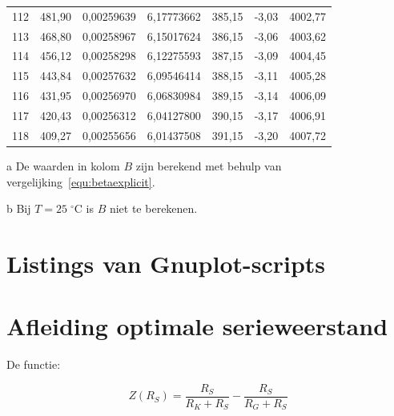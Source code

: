 \documentclass[12pt,a4paper,final,twoside,fleqn]{article}
\newcommand{\mathcelc}[1]{\mbox{$#1\;^\circ\text{C}$}}
\begin{document}
\begin{ThreePartTable}
\begin{longtable}{rrrrrrr}
112          & 481,90    & 0,00259639    & 6,17773662  & 385,15     & -3,03      & 4002,77 \\
113          & 468,80    & 0,00258967    & 6,15017624  & 386,15     & -3,06      & 4003,62 \\
114          & 456,12    & 0,00258298    & 6,12275593  & 387,15     & -3,09      & 4004,45 \\
115          & 443,84    & 0,00257632    & 6,09546414  & 388,15     & -3,11      & 4005,28 \\
116          & 431,95    & 0,00256970    & 6,06830984  & 389,15     & -3,14      & 4006,09 \\
117          & 420,43    & 0,00256312    & 6,04127800  & 390,15     & -3,17      & 4006,91 \\
118          & 409,27    & 0,00255656    & 6,01437508  & 391,15     & -3,20      & 4007,72 \\
\end{longtable}
\begin{tablenotes}
\footnotesize
\item [a] De waarden in kolom $B$ zijn berekend met behulp van vergelijking~\eqref{equ:betaexplicit}.
\item [b] Bij $T=\mathcelc{25}$ is $B$ niet te berekenen.
\end{tablenotes}
\end{ThreePartTable}

\clearpage
\section{Listings van Gnuplot-scripts}
\label{app:ntc_shh_kelvin}

\newpage
\label{app:ntc_shh_straightline_beta}

\newpage
\label{app:ntc_shh_straightline_adapt}



\clearpage
\section{Afleiding optimale serieweerstand}
\label{app:afleiding}
De functie:

\begin{equation}
Z(R_S) = \dfrac{R_S}{R_K+R_S}-\dfrac{R_S}{R_G+R_S}
\end{equation}
\end{document}
